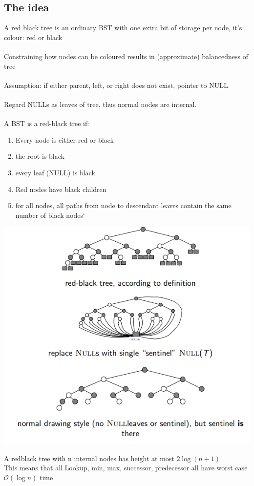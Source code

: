 \documentclass{article}[18pt]
\begin{document}
\subsection{The idea}
A red black tree is an ordinary BST with one extra bit of storage per node, it's colour: red or black\\
\\
Constraining how nodes can be coloured results in (approximate) balancedness of tree\\
\\
Assumption: if either parent, left, or right does not exist, pointer to NULL\\
\\
Regard NULLs as leaves of tree, thus normal nodes are internal.\\
\\
A BST is a red-black tree if:
\begin{enumerate}
	\item Every node is either red or black
	\item the root is black
	\item every leaf (NULL) is black
	\item Red nodes have black children
	\item for all nodes, all paths from node to descendant leaves contain the same number of black nodes`
\end{enumerate}
\begin{center}
	\includegraphics[scale=0.7]{redblack}
\end{center}
A redblack tree with n internal nodes has height at most $2\log(n+1)$\\
This means that all Lookup, min, max, successor, predecessor all have worst case $\mathcal{O}(\log n)$ time
\end{document}
